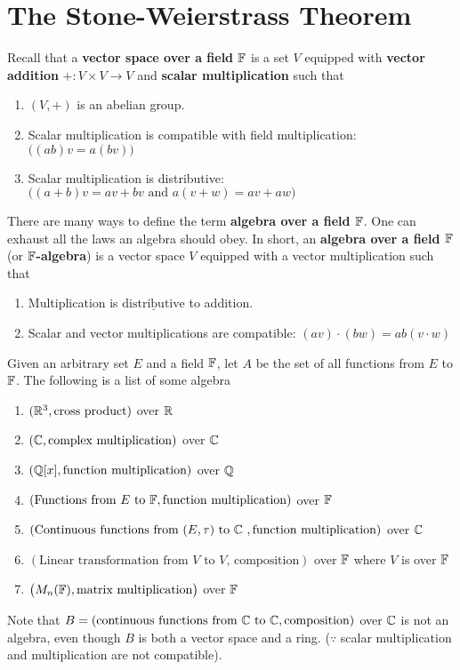 \documentclass{report}
\begin{document}
\section{The Stone-Weierstrass Theorem}
\begin{mdframed}
Recall that a \textbf{vector space over a field $\mathbb{F}$} is a set $V$ equipped with \textbf{vector addition} $+:V\times V\to V$  and \textbf{scalar multiplication}  such that 
\begin{enumerate}[label=(\alph*)]
  \item $(V,+)$ is an abelian group. 
  \item Scalar multiplication is compatible with field multiplication:   $\Big((ab)v=a(bv) \Big)$
  \item Scalar multiplication is distributive: $\Big((a+b)v=av+bv\text{ and }a(v+w)=av+aw \Big)$
\end{enumerate}

There are many ways to define the term \textbf{algebra over a field $\mathbb{F}$}. One can exhaust all the laws an algebra should obey. In short, an \textbf{algebra over a field $\mathbb{F}$} (or \textbf{$\mathbb{F}$-algebra}) is a vector space $V$ equipped with a vector multiplication such that  
\begin{enumerate}[label=(\roman*)]
  \item Multiplication is $\underline{\text{distributive}}$ to addition. 
   \item Scalar and vector multiplications are compatible: $(av)\cdot (bw)=ab(v\cdot w)$
\end{enumerate}
Given an arbitrary set $E$ and a field $\mathbb{F}$, let $A$ be the set of all functions from  $E$ to $\mathbb{F}$. The following is a list of some algebra 
\begin{enumerate}[label=(\alph*)]
  \item $(\mathbb{R}^3,\text{cross product})$  over $\mathbb{R}$ 
  \item $(\mathbb{C},\text{complex multiplication})$ over $\mathbb{C}$ 
  \item $(\mathbb{Q}[x],\text{function multiplication})$ over $\mathbb{Q}$
  \item $(\text{Functions from }E\text{ to }\mathbb{F},\text{function multiplication})$ over $\mathbb{F}$
  \item $(\text{Continuous functions from $(E,\tau)$ to $\mathbb{C}$ },\text{function multiplication})$ over $\mathbb{C}$  
  \item $(\text{Linear transformation from $V$ to $V$, composition})$ over $\mathbb{F}$ where  $V$ is over $\mathbb{F}$
  \item $\big(M_n(\mathbb{F}),\text{matrix multiplication}\big)$ over $\mathbb{F}$
\end{enumerate}
Note that $B=(\text{continuous functions from }\mathbb{C}\text{ to }\mathbb{C},\text{composition})$ over $\mathbb{C}$ is not an algebra, even though $B$ is both a vector space and a ring. ($\because$ scalar multiplication and multiplication are not compatible).\\


\end{mdframed}
\end{document}
